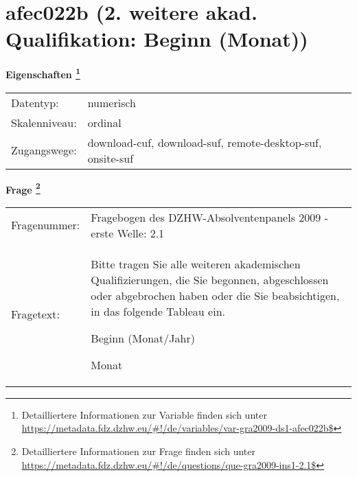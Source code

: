
    \setcounter{footnote}{0}

    \vspace*{-1.8cm}
	\section{afec022b (2. weitere akad. Qualifikation: Beginn (Monat))}
	\label{section:afec022b}



    \vspace*{0.5cm}
    \noindent\textbf{Eigenschaften
	\footnote{Detailliertere Informationen zur Variable finden sich unter
		\url{https://metadata.fdz.dzhw.eu/\#!/de/variables/var-gra2009-ds1-afec022b$}}}\\
	\begin{tabularx}{\hsize}{@{}lX}
	Datentyp: & numerisch \\
	Skalenniveau: & ordinal \\
	Zugangswege: &
	  download-cuf, 
	  download-suf, 
	  remote-desktop-suf, 
	  onsite-suf
 \\
    \end{tabularx}



				\vspace*{0.5cm}
                \noindent\textbf{Frage
	                \footnote{Detailliertere Informationen zur Frage finden sich unter
		              \url{https://metadata.fdz.dzhw.eu/\#!/de/questions/que-gra2009-ins1-2.1$}}}\\
				\begin{tabularx}{\hsize}{@{}lX}
					Fragenummer: &
					  Fragebogen des DZHW-Absolventenpanels 2009 - erste Welle:
					  2.1
 \\
					Fragetext: & Bitte tragen Sie alle weiteren akademischen Qualifizierungen, die Sie begonnen, abgeschlossen oder abgebrochen haben oder die Sie beabsichtigen, in das folgende Tableau ein.\par  Beginn (Monat/Jahr)\par  Monat \\
				\end{tabularx}





